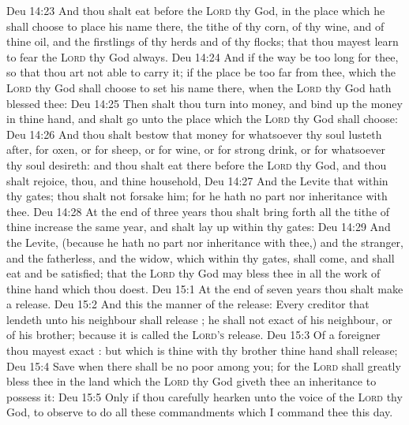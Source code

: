 \vs Deu 14:23 And thou shalt eat before the \textsc{Lord} thy God, in the place which he shall choose to place his name there, the tithe of thy corn, of thy wine, and of thine oil, and the firstlings of thy herds and of thy flocks; that thou mayest learn to fear the \textsc{Lord} thy God always.
\vs Deu 14:24 And if the way be too long for thee, so that thou art not able to carry it;  if the place be too far from thee, which the \textsc{Lord} thy God shall choose to set his name there, when the \textsc{Lord} thy God hath blessed thee:
\vs Deu 14:25 Then shalt thou turn  into money, and bind up the money in thine hand, and shalt go unto the place which the \textsc{Lord} thy God shall choose:
\vs Deu 14:26 And thou shalt bestow that money for whatsoever thy soul lusteth after, for oxen, or for sheep, or for wine, or for strong drink, or for whatsoever thy soul desireth: and thou shalt eat there before the \textsc{Lord} thy God, and thou shalt rejoice, thou, and thine household,
\vs Deu 14:27 And the Levite that  within thy gates; thou shalt not forsake him; for he hath no part nor inheritance with thee.
\vs Deu 14:28 At the end of three years thou shalt bring forth all the tithe of thine increase the same year, and shalt lay  up within thy gates:
\vs Deu 14:29 And the Levite, (because he hath no part nor inheritance with thee,) and the stranger, and the fatherless, and the widow, which  within thy gates, shall come, and shall eat and be satisfied; that the \textsc{Lord} thy God may bless thee in all the work of thine hand which thou doest.
\vs Deu 15:1 At the end of  seven years thou shalt make a release.
\vs Deu 15:2 And this  the manner of the release: Every creditor that lendeth  unto his neighbour shall release ; he shall not exact  of his neighbour, or of his brother; because it is called the \textsc{Lord's} release.
\vs Deu 15:3 Of a foreigner thou mayest exact : but  which is thine with thy brother thine hand shall release;
\vs Deu 15:4 Save when there shall be no poor among you; for the \textsc{Lord} shall greatly bless thee in the land which the \textsc{Lord} thy God giveth thee  an inheritance to possess it:
\vs Deu 15:5 Only if thou carefully hearken unto the voice of the \textsc{Lord} thy God, to observe to do all these commandments which I command thee this day.
